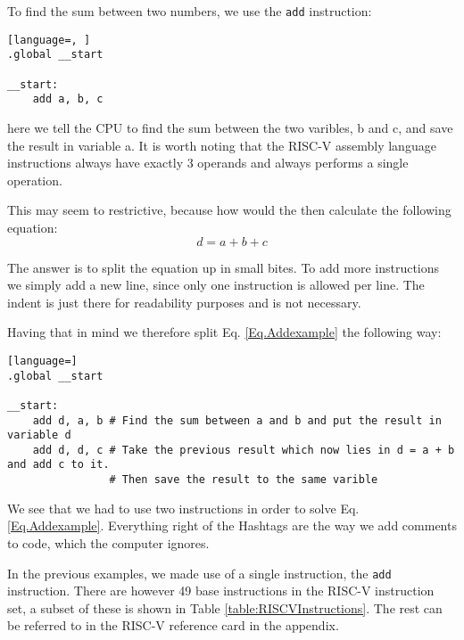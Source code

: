     To find the sum between two numbers, we use the \texttt{add} instruction:
    \begin{lstlisting}[language=, ]
.global __start

__start:
    add a, b, c
    \end{lstlisting}
    here we tell the CPU to find the sum between the two varibles, b and c, and save the result in variable a. It is worth noting that the RISC-V assembly language instructions always have exactly 3 operands and always performs a single operation.
    
    This may seem to restrictive, because how would the then calculate the following equation:
    \begin{equation}\label{Eq.Addexample}
        d = a + b + c
    \end{equation}
    
    The answer is to split the equation up in small bites. To add more instructions we simply add a new line, since only one instruction is allowed per line. The indent is just there for readability purposes and is not necessary. 
    
    Having that in mind we therefore split Eq. \ref{Eq.Addexample} the following way:
    \begin{lstlisting}[language=]
.global __start

__start:
    add d, a, b # Find the sum between a and b and put the result in variable d
    add d, d, c # Take the previous result which now lies in d = a + b and add c to it. 
                # Then save the result to the same varible 
    \end{lstlisting}
    We see that we had to use two instructions in order to solve Eq. \ref{Eq.Addexample}. Everything right of the Hashtags are the way we add comments to code, which the computer ignores.
    
    In the previous examples, we made use of a single instruction, the \texttt{add} instruction. There are however 49 base instructions in the RISC-V instruction set, a subset of these is shown in Table \ref{table:RISCVInstructions}. The rest can be referred to in the RISC-V reference card in the appendix.   

